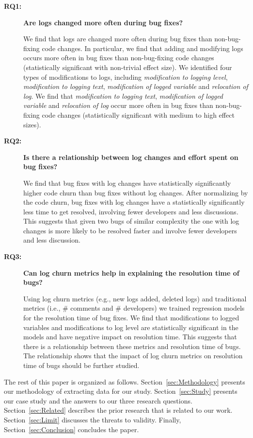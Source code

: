 \begin{description}
\item[\textbf{RQ1:}]\textbf{Are logs changed more often during bug fixes?} 

We find that logs are changed more often during bug fixes than non-bug-fixing code changes. In particular, we find that adding and modifying logs occurs more often in bug fixes than non-bug-fixing code changes (statistically significant with non-trivial effect size). We identified four types of modifications to logs, including \emph{modification to logging level}, \emph{modification to logging text}, \emph{modification of logged variable} and \emph{relocation of log}. We find that \emph{modification to logging text}, \emph{modification of logged variable} and \emph{relocation of log} occur more often in bug fixes than non-bug-fixing code changes (statistically significant with medium to high effect sizes). 



\item[\textbf{RQ2:}]\textbf{Is there a relationship between log changes and effort spent on bug fixes?}

We find that bug fixes with log changes have statistically significantly higher code churn than bug fixes without log changes. After normalizing by the code churn, bug fixes with log changes have a statistically significantly less time to get resolved, involving fewer developers and less discussions. This suggests that given two bugs of similar complexity the one with log changes is more likely to be resolved faster and involve fewer developers and less discussion. 

\item[\textbf{RQ3:}]\textbf{Can log churn metrics help in explaining the resolution time of bugs?}

Using log churn metrics (e.g., new logs added, deleted logs) and traditional metrics (i.e., \# comments and \# developers) we trained regression models for the resolution time of bug fixes. We find that modifications to logged variables and modifications to log level are statistically significant in the models and have negative impact on resolution time. This suggests that there is a relationship between these metrics and resolution time of bugs. The relationship shows that the impact of log churn metrics on resolution time of bugs should be further studied. 

\end{description}


The rest of this paper is organized as follows. Section~\ref{sec:Methodology} presents our methodology of extracting data for our study. Section~\ref{sec:Study} presents our case study and the answers to our three research questions. Section~\ref{sec:Related} describes the prior research that is related to our work. Section~\ref{sec:Limit} discusses the threats to validity. Finally, Section~\ref{sec:Conclusion} concludes the paper.


